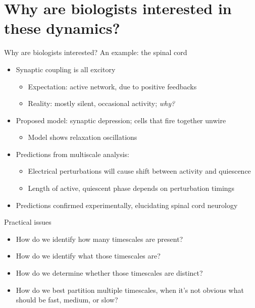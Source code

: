 \documentclass[presentation]{beamer}
\begin{document}
\section{Why are biologists interested in these dynamics?}
\label{sec:orgd7198fe}
\begin{frame}[label={sec:org62c840d}]{Why are biologists interested?}
An example: the spinal cord
\vfill
\begin{itemize}
\item Synaptic coupling is all excitory
\begin{itemize}
\item Expectation: active network, due to positive feedbacks
\item Reality: mostly silent, occasional activity; \emph{why?}
\end{itemize}
\item Proposed model: synaptic depression; cells that fire together unwire
\begin{itemize}
\item Model shows relaxation oscillations
\end{itemize}
\item Predictions from multiscale analysis:
\begin{itemize}
\item Electrical perturbations will cause shift between activity and quiescence
\item Length of active, quiescent phase depends on perturbation timings
\end{itemize}
\item Predictions confirmed experimentally, elucidating spinal cord neurology
\end{itemize}
\end{frame}


\begin{frame}[label={sec:org912fc82}]{Practical issues}
\begin{itemize}
\item How do we identify how many timescales are present?
\item How do we identify what those timescales are?
\item How do we determine whether those timescales are distinct?
\item How do we best partition multiple timescales, when it's not obvious what should be fast, medium, or slow?
\end{itemize}
\end{frame}
\end{document}
